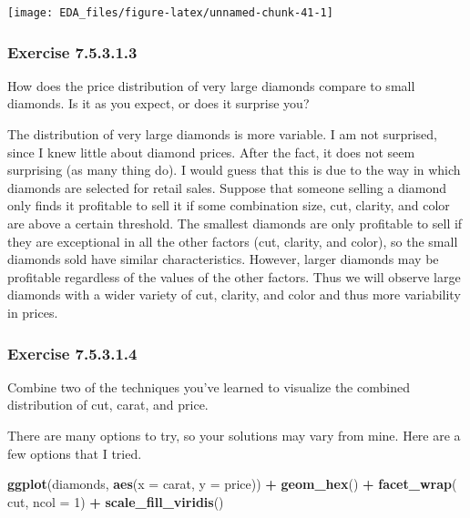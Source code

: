 \documentclass[]{book}
\newenvironment{Shaded}{\begin{snugshade}}{\end{snugshade}}
\newcommand{\DataTypeTok}[1]{\textcolor[rgb]{0.13,0.29,0.53}{#1}}
\newcommand{\DecValTok}[1]{\textcolor[rgb]{0.00,0.00,0.81}{#1}}
\newcommand{\KeywordTok}[1]{\textcolor[rgb]{0.13,0.29,0.53}{\textbf{#1}}}
\newcommand{\NormalTok}[1]{#1}
\newcommand{\OperatorTok}[1]{\textcolor[rgb]{0.81,0.36,0.00}{\textbf{#1}}}
\newcommand{\StringTok}[1]{\textcolor[rgb]{0.31,0.60,0.02}{#1}}
\theoremstyle{plain}
\theoremstyle{remark}
\begin{document}
\begin{center}\texttt{[image: EDA\_files/figure-latex/unnamed-chunk-41-1]} \end{center}

\hypertarget{exercise-7.5.3.1.3}{%
\subsubsection*{\texorpdfstring{Exercise {7.5.3.1.3}}{Exercise 7.5.3.1.3}}\label{exercise-7.5.3.1.3}}

How does the price distribution of very large diamonds compare to small diamonds.
Is it as you expect, or does it surprise you?

The distribution of very large diamonds is more variable.
I am not surprised, since I knew little about diamond prices.
After the fact, it does not seem surprising (as many thing do).
I would guess that this is due to the way in which diamonds are selected for retail sales.
Suppose that someone selling a diamond only finds it profitable to sell it if some combination size, cut, clarity, and color are above a certain threshold.
The smallest diamonds are only profitable to sell if they are exceptional in all the other factors (cut, clarity, and color), so the small diamonds sold have similar characteristics.
However, larger diamonds may be profitable regardless of the values of the other factors.
Thus we will observe large diamonds with a wider variety of cut, clarity, and color and thus more variability in prices.

\hypertarget{exercise-7.5.3.1.4}{%
\subsubsection*{\texorpdfstring{Exercise {7.5.3.1.4}}{Exercise 7.5.3.1.4}}\label{exercise-7.5.3.1.4}}

Combine two of the techniques you've learned to visualize the combined distribution of cut, carat, and price.

There are many options to try, so your solutions may vary from mine.
Here are a few options that I tried.

\begin{Shaded}
\begin{Highlighting}[]
\KeywordTok{ggplot}\NormalTok{(diamonds, }\KeywordTok{aes}\NormalTok{(}\DataTypeTok{x =}\NormalTok{ carat, }\DataTypeTok{y =}\NormalTok{ price)) }\OperatorTok{+}
\StringTok{  }\KeywordTok{geom_hex}\NormalTok{() }\OperatorTok{+}
\StringTok{  }\KeywordTok{facet_wrap}\NormalTok{(}\OperatorTok{~}\StringTok{ }\NormalTok{cut, }\DataTypeTok{ncol =} \DecValTok{1}\NormalTok{) }\OperatorTok{+}
\StringTok{  }\KeywordTok{scale_fill_viridis}\NormalTok{()}
\end{Highlighting}
\end{Shaded}
\end{document}
